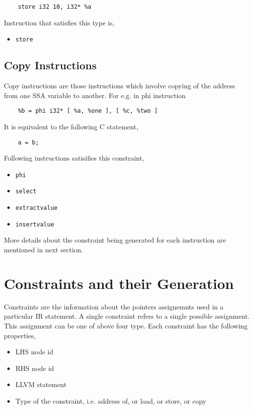 \documentclass[a4paper,11pt]{report}
\begin{document}
\begin{lstlisting}
    store i32 10, i32* %a
\end{lstlisting}

\noindent
Instruction that satisfies this type is,
\begin{itemize}
 \item \texttt{store}
\end{itemize}


\subsection{Copy Instructions}
Copy instructions are those instructions which involve copying of the address 
from one SSA variable to another. For e.g. in phi instruction
\begin{lstlisting}
    %b = phi i32* [ %a, %one ], [ %c, %two ]
\end{lstlisting}

\noindent
It is equivalent to the following C statement,
\begin{lstlisting}
    a = b;
\end{lstlisting}

\noindent
Following instructions satisifies this constraint,
\begin{itemize}
    \item \texttt{phi}
    \item \texttt{select}
    \item \texttt{extractvalue}
    \item \texttt{insertvalue}
\end{itemize}

More details about the constraint being generated for each instruction are
mentioned in next section.

\section{Constraints and their Generation}
Constraints are the information about the pointers assignemnts used in a 
particular IR statement. A single constraint refers to a single possible 
assignment. This assignment can be one of above four type. Each constraint has 
the following properties,

\begin{itemize}
    \item LHS node id
    \item RHS node id
    \item LLVM statement
    \item Type of the constraint, i.e. address of, or load, or store, or copy
\end{itemize}
\end{document}
